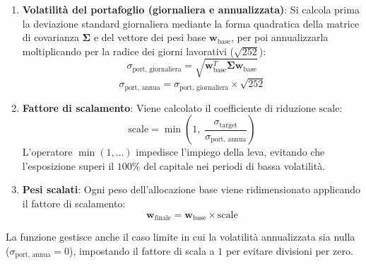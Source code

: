 \begin{enumerate}
    \item \textbf{Volatilità del portafoglio (giornaliera e annualizzata)}: Si calcola prima la deviazione standard giornaliera mediante la forma quadratica della matrice di covarianza $\mathbf{\Sigma}$ e del vettore dei pesi base $\mathbf{w}_{\text{base}}$, per poi annualizzarla moltiplicando per la radice dei giorni lavorativi ($\sqrt{252}$):
    \begin{equation}
        \sigma_{\text{port, giornaliera}} = \sqrt{\mathbf{w}_{\text{base}}^T \mathbf{\Sigma} \mathbf{w}_{\text{base}}}
    \end{equation}
    \begin{equation}
        \sigma_{\text{port, annua}} = \sigma_{\text{port, giornaliera}} \times \sqrt{252}
    \end{equation}

    \item \textbf{Fattore di scalamento}: Viene calcolato il coefficiente di riduzione $\text{scale}$:
    \begin{equation}
        \text{scale} = \min\left(1, \; \frac{\sigma_{\text{target}}}{\sigma_{\text{port, annua}}}\right)
    \end{equation}
    L'operatore $\min(1, \dots)$ impedisce l'impiego della leva, evitando che l'esposizione superi il $100\%$ del capitale nei periodi di bassa volatilità.

    \item \textbf{Pesi scalati}: Ogni peso dell'allocazione base viene ridimensionato applicando il fattore di scalamento:
    \begin{equation}
        \mathbf{w}_{\text{finale}} = \mathbf{w}_{\text{base}} \times \text{scale}
    \end{equation}
\end{enumerate}

La funzione gestisce anche il caso limite in cui la volatilità annualizzata sia nulla ($\sigma_{\text{port, annua}} = 0$), impostando il fattore di scala a $1$ per evitare divisioni per zero.
